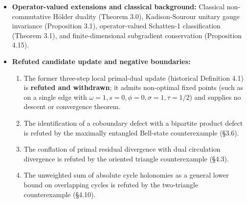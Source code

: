\documentclass[
]{article}
\providecommand{\tightlist}{%
  \setlength{\itemsep}{0pt}\setlength{\parskip}{0pt}}
\providecommand{\tightlist}{%
  \setlength{\itemsep}{0pt}\setlength{\parskip}{0pt}}
\begin{document}
\begin{itemize}
  \begin{enumerate}
  \def\labelenumi{\arabic{enumi}.}
  \tightlist
  \item
    \emph{Functorial aggregation monotonicity (Theorem 2.1):} Defect contraction under commuting cochain pushforward and global \(\ell^1\) contractivity.
  \item
    \emph{Finite scalar KKT certificate (Theorem 4.2):} Exact optimality of a feasible residual admitting a divergence-free norming dual circulation, established via weak linear programming duality.
  \item
    \emph{Contractive-path distinguishability bound (Theorem 5.1):} Telescoping endpoint bound bounding operational distinguishability across Schatten-\(p\) spaces.
  \item
    \emph{Exact comparison-operator secular root (Proposition E.7e):} Unambiguous secular-equation root characterization and its transfer via the Loewner bound to lower-bound the represented spectral defect.
  \end{enumerate}
\item
  \textbf{Operator-valued extensions and classical background:} Classical non-commutative Hölder duality (Theorem 3.0), Kadison-Sourour unitary gauge invariance (Proposition 3.1), operator-valued Schatten-1 classification (Theorem 3.1), and finite-dimensional subgradient conservation (Proposition 4.15).
\item
  \textbf{Refuted candidate update and negative boundaries:}

  \begin{enumerate}
  \def\labelenumi{\arabic{enumi}.}
  \tightlist
  \item
    The former three-step local primal-dual update (historical Definition 4.1) is \textbf{refuted and withdrawn}; it admits non-optimal fixed points (such as on a single edge with \(\omega=1, s=0, \phi=0, \sigma=1, \tau=1/2\)) and supplies no descent or convergence theorem.
  \item
    The identification of a coboundary defect with a bipartite product defect is refuted by the maximally entangled Bell-state counterexample (§3.6).
  \item
    The conflation of primal residual divergence with dual circulation divergence is refuted by the oriented triangle counterexample (§4.3).
  \item
    The unweighted sum of absolute cycle holonomies as a general lower bound on overlapping cycles is refuted by the two-triangle counterexample (§4.10).
  \end{enumerate}
\end{itemize}
\end{document}
